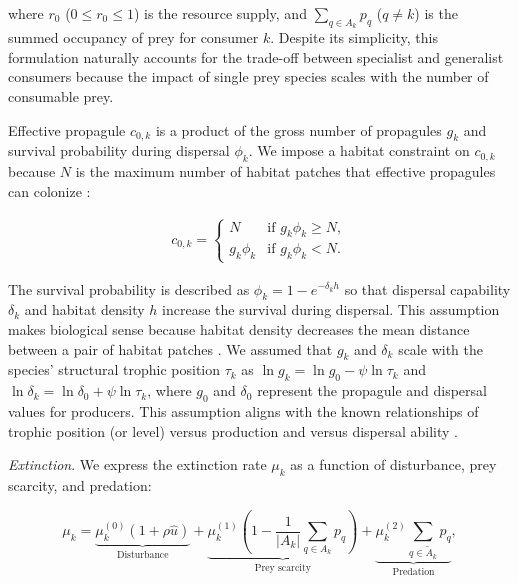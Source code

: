 \documentclass[11pt, class=article, crop=false]{standalone}
\begin{document}
where $r_0$ ($0 \le r_0 \le 1$) is the resource supply, and $\sum_{q \in A_{k}} p_{q}$ ($q \ne k$) is the summed occupancy of prey for consumer $k$.
Despite its simplicity, this formulation naturally accounts for the trade-off between specialist and generalist consumers because the impact of single prey species scales with the number of consumable prey.

Effective propagule $c_{0,k}$ is a product of the gross number of propagules $g_k$ and survival probability during dispersal $\phi_k$.
We impose a habitat constraint on $c_{0,k}$ because $N$ is the maximum number of habitat patches that effective propagules can colonize \citep{takimoto_effects_2012, terui_spatial_2019}:

\begin{align}
    c_{0, k} = 
    \begin{cases}
        N & \text{if $g_k \phi_k \ge N$},\\
        g_k \phi_k & \text{if $g_k \phi_k < N$}.
    \end{cases}
    \label{eq:c0-prod-method}
\end{align}

The survival probability is described as $\phi_k = 1 - e^{-\delta_k h}$ so that dispersal capability $\delta_k$ and habitat density $h$ increase the survival during dispersal.
This assumption makes biological sense because habitat density decreases the mean distance between a pair of habitat patches \citep{terui_spatial_2019}.
We assumed that $g_k$ and $\delta_k$ scale with the species' structural trophic position $\tau_k$ as $\ln g_k = \ln g_0 - \psi \ln \tau_k$ and $\ln \delta_k = \ln \delta_0 + \psi \ln \tau_k$, where $g_0$ and $\delta_0$ represent the propagule and dispersal values for producers.
This assumption aligns with the known relationships of trophic position (or level) versus production \citep{finlay_stream_2011} and versus dispersal ability \citep{mccann_dynamics_2005}.

\textit{Extinction}. We express the extinction rate $\mu_k$ as a function of disturbance, prey scarcity, and predation:

\begin{equation}
    \mu_{k} = 
        \underbrace{\mu_{k}^{(0)} (1 + \rho \hat{u})}_{\text{Disturbance}} + 
        \underbrace{\mu_{k}^{(1)} \left(1 - \frac{1}{|A_{k}|}\sum_{q\in A_{k}} p_{q}\right)}_{\text{Prey scarcity}} + 
        \underbrace{\mu_{k}^{(2)} \sum_{q \in \tilde{A}_{k}} p_{q}}_{\text{Predation}},
    \label{eq:extn}    
\end{equation}
\end{document}
